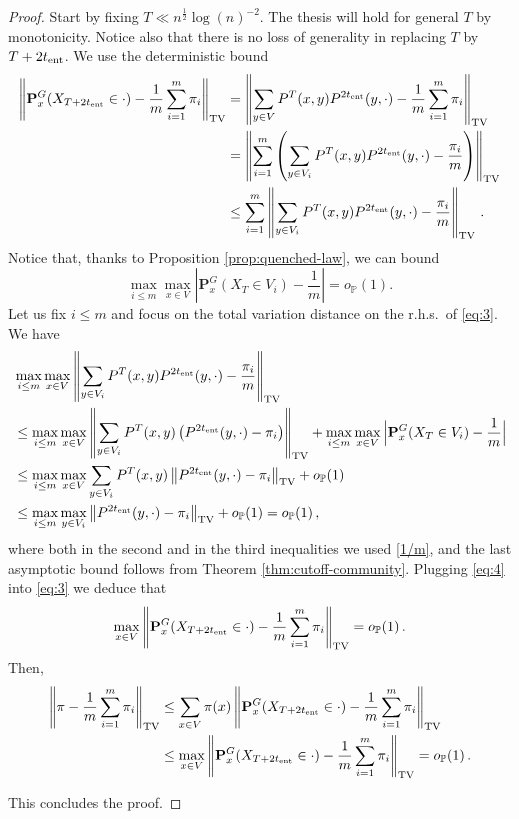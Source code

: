 \documentclass[11pt,oneside]{amsart}
\numberwithin{equation}{section}  %
\theoremstyle{plain}
\newcommand{\rhs}{{r.h.s.~}}
\newcommand{\p}{\mathbb{P}}
\newcommand{\op}{o_{\p}}
\newcommand{\tent}{t_{\textup{ent}}}
\newcommand{\quenchG}{\mathbf{P}^G}
\begin{document}
	\begin{proof}
Start by fixing $T \ll {n}^{ \frac12 }{\log(n)^{-2}}$. The thesis will hold for general $T$ by monotonicity.
Notice also that there is no loss of generality in replacing $T$ by $T+2\tent$. We use the deterministic bound
		\begin{equation}\label{eq:3}
		\begin{split}
			\left\|\quenchG_x(X_{T+{2\tent}}\in\cdot)-\frac 1m\sum_{i=1}^m  \pi_i\right\|_{\rm TV}&=\left\|\sum_{y \in V}P^T(x,y)P^{2\tent}(y,\cdot)-\frac 1m\sum_{i=1}^m  \pi_i\right\|_{\rm TV} \\
			&=  \left\|\sum_{i=1}^m\left(\sum_{y \in V_i}P^T(x,y)P^{2\tent}(y,\cdot)-\frac{\pi_i}{m}\right)\right\|_{\rm TV}\\
			&\le  \sum_{i=1}^m \left\|\sum_{y \in V_i}P^T(x,y)P^{2\tent}(y,\cdot)-\frac{\pi_i}{m}\right\|_{\rm TV}\,.
		\end{split}
		\end{equation}
		Notice that, thanks to Proposition \ref{prop:quenched-law}, we can bound
		\begin{equation} \label{1/m}
		\max_{i \le m}\max_{x \in V}\left|\quenchG_x(X_T \in V_i)-\frac{1}{m}\right|=\op(1).
		\end{equation}
	Let us fix $i \le m$ and focus on the total variation distance on the \rhs of \eqref{eq:3}. We have
		\begin{equation}
		\begin{split}\label{eq:4}
		&		\max_{i \le m}\max_{x \in V}\left\|\sum_{y \in V_i} P^T(x,y)P^{2\tent}(y,\cdot)-\frac{\pi_i}{m}\right\|_{\rm TV} \\
			&\le 	\max_{i \le m}\max_{x \in V}\left\|\sum_{y \in V_i}P^T(x,y)\left(P^{2\tent}(y,\cdot)-\pi_i\right)\right\|_{\rm TV}+ 	\max_{i \le m}\max_{x \in V}\Big|\quenchG_x(X_T \in V_i)-\frac{1}{m}\Big|\\
			& \le \max_{i \le m}\max_{x \in V}\sum_{y \in V_i}P^T(x,y)\left\|P^{2\tent}(y,\cdot)-\pi_i\right\|_{\rm TV}+\op(1)\\
			& \le	\max_{i \le m}\max_{y\in V_i} \left\|P^{2\tent}(y,\cdot)-\pi_i\right\|_{\rm TV}+ \op(1)=\op(1) \,,
		\end{split}
		\end{equation}
        	where both in the second and in the third inequalities we used \eqref{1/m}, and the last asymptotic bound follows from Theorem \ref{thm:cutoff-community}.  Plugging \eqref{eq:4} into \eqref{eq:3} we deduce that
		 $$\max_{x\in V} \left\|\quenchG_x(X_{T+2\tent}\in\cdot)-\frac1m\sum_{i=1}^m\pi_i\right\|_{\rm TV}=\op(1)\,.$$
		 Then, 
		 \begin{equation} \label{4.18}
		 \begin{split}
		 \left\|\pi-\frac1m\sum_{i=1}^m\pi_i\right\|_{\rm TV} 
		 &\le \sum_{x \in V} \pi(x) \left\|\quenchG_x(X_{T+2\tent}\in\cdot)-\frac1m\sum_{i=1}^m\pi_i\right\|_{\rm TV}\\
		 &\le \max_{x\in V} \left\|\quenchG_x(X_{T+2\tent}\in\cdot)-\frac1m\sum_{i=1}^m\pi_i\right\|_{\rm TV}=\op(1)\,.
		 \end{split}
		\end{equation} 

		This concludes the proof.
	\end{proof}
\end{document}
